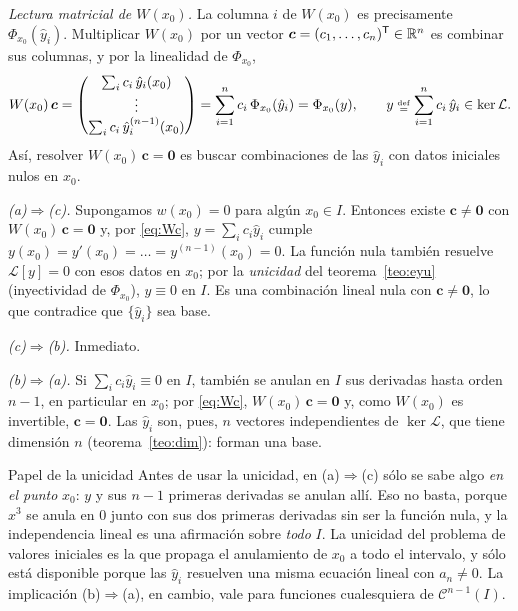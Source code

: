\documentclass[11pt,twoside]{article}
\newcommand\Lop{\mathcal L}
\newcommand\yh{\hat y}
\newcommand\Cl{\mathcal C}
\newcommand\vc{\bm c}
\newcommand\mat[1]{\begin{pmatrix}#1\end{pmatrix}}
\begin{document}
\begin{demostracion}
\emph{Lectura matricial de $W(x_0)$.} La columna $i$ de $W(x_0)$ es precisamente $\Phi_{x_0}(\yh_i)$. Multiplicar
$W(x_0)$ por un vector $\vc=(c_1,\dots,c_n)\T\in\R^n$ es combinar sus columnas, y por la linealidad de $\Phi_{x_0}$,
\begin{equation}\label{eq:Wc}
W(x_0)\,\vc=\mat{\sum_ic_i\,\yh_i(x_0)\\ \vdots\\ \sum_ic_i\,\yh_i^{(n-1)}(x_0)}=\sum_{i=1}^{n}c_i\,\Phi_{x_0}(\yh_i)=\Phi_{x_0}(y),
\qquad y\defeq\sum_{i=1}^{n}c_i\,\yh_i\in\ker\Lop.
\end{equation}
Así, resolver $W(x_0)\,\vc=\bm0$ es buscar combinaciones de las $\yh_i$ con datos iniciales nulos en $x_0$.

\emph{(a)$\Rightarrow$(c).} Supongamos $w(x_0)=0$ para algún $x_0\in I$. Entonces existe $\vc\neq\bm0$ con
$W(x_0)\,\vc=\bm0$ y, por \eqref{eq:Wc}, $y=\sum_ic_i\yh_i$ cumple $y(x_0)=y'(x_0)=\dots=y^{(n-1)}(x_0)=0$. La función
nula también resuelve $\Lop[y]=0$ con esos datos en $x_0$; por la \emph{unicidad} del teorema~\ref{teo:eyu}
(inyectividad de $\Phi_{x_0}$), $y\equiv0$ en $I$. Es una combinación lineal nula con $\vc\neq\bm0$, lo que contradice que
$\{\yh_i\}$ sea base.

\emph{(c)$\Rightarrow$(b).} Inmediato.

\emph{(b)$\Rightarrow$(a).} Si $\sum_ic_i\yh_i\equiv0$ en $I$, también se anulan en $I$ sus derivadas hasta orden $n-1$,
en particular en $x_0$; por \eqref{eq:Wc}, $W(x_0)\,\vc=\bm0$ y, como $W(x_0)$ es invertible, $\vc=\bm0$. Las $\yh_i$
son, pues, $n$ vectores independientes de $\ker\Lop$, que tiene dimensión $n$ (teorema~\ref{teo:dim}): forman una base.
\end{demostracion}

\begin{motivacion}{Papel de la unicidad}
Antes de usar la unicidad, en (a)$\Rightarrow$(c) sólo se sabe algo \emph{en el punto} $x_0$: $y$ y sus $n-1$ primeras
derivadas se anulan allí. Eso no basta, porque $x^3$ se anula en $0$ junto con sus dos primeras derivadas sin ser la
función nula, y la independencia lineal es una afirmación sobre \emph{todo} $I$. La unicidad del problema de valores
iniciales es la que propaga el anulamiento de $x_0$ a todo el intervalo, y sólo está disponible porque las $\yh_i$
resuelven una misma ecuación lineal con $a_n\neq0$. La implicación (b)$\Rightarrow$(a), en cambio, vale para funciones
cualesquiera de $\Cl^{n-1}(I)$.
\end{motivacion}
\end{document}
